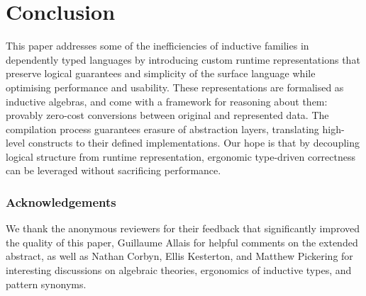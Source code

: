 \section{Conclusion}

This paper addresses some of the inefficiencies of inductive families in
dependently typed languages by introducing custom runtime representations that
preserve logical guarantees and simplicity of the surface language while
optimising performance and usability. These representations are formalised as inductive
algebras, and come with a framework for reasoning about them: provably zero-cost
conversions between original and represented data.
The compilation process guarantees erasure of abstraction layers, translating
high-level constructs to their defined implementations. Our hope is that by
decoupling logical structure from runtime representation, ergonomic type-driven
correctness can be leveraged without sacrificing performance.


\subsubsection{Acknowledgements}
We thank the anonymous reviewers for their feedback that
significantly improved the quality of this paper, Guillaume Allais for helpful
comments on the extended abstract, as well as Nathan Corbyn, Ellis
Kesterton, and Matthew Pickering for interesting discussions on algebraic
theories, ergonomics of inductive types, and pattern synonyms.
